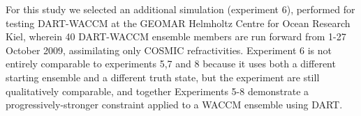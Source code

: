 For this study we selected an additional simulation (experiment 6), performed for testing DART-WACCM at the GEOMAR Helmholtz Centre for Ocean Research Kiel, wherein 40 DART-WACCM ensemble members are run forward from 1-27 October 2009, assimilating only COSMIC refractivities.  
Experiment 6 is not entirely comparable to experiments 5,7 and 8 because it uses both a different starting ensemble and a different truth state, but the experiment are still qualitatively comparable, and together Experiments 5-8 demonstrate a progressively-stronger constraint applied to a WACCM ensemble using DART.  





